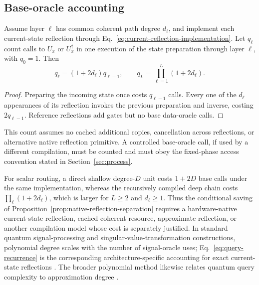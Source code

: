 \documentclass[pdflatex,sn-mathphys,NameDate,iicol]{sn-jnl}
\begin{document}
\subsection{Base-oracle accounting}

\begin{proposition}
\label{prop:query-recurrence}
Assume layer $\ell$ has common coherent path degree $d_\ell$, and implement
each current-state reflection through
Eq.~\eqref{eq:current-reflection-implementation}. Let $q_\ell$ count calls
to $U_x$ or $U_x^\dagger$ in one execution of the state preparation through
layer $\ell$, with $q_0=1$. Then
\begin{equation}
 q_\ell=(1+2d_\ell)q_{\ell-1},
 \qquad
 q_L=\prod_{\ell=1}^{L}(1+2d_\ell).
 \label{eq:query-recurrence}
\end{equation}
\end{proposition}

\begin{proof}
Preparing the incoming state once costs $q_{\ell-1}$ calls. Every one of the
$d_\ell$ appearances of its reflection invokes the previous preparation and
inverse, costing $2q_{\ell-1}$. Reference reflections add gates but no base
data-oracle calls.
\end{proof}

This count assumes no cached additional copies, cancellation across
reflections, or alternative native reflection primitive. A controlled
base-oracle call, if used by a different compilation, must be counted and
must obey the fixed-phase access convention stated in Section~\ref{sec:process}.

For scalar routing, a direct shallow degree-$D$ unit costs $1+2D$ base
calls under the same implementation, whereas the recursively compiled deep
chain costs $\prod_\ell(1+2d_\ell)$, which is larger for $L\ge2$ and
$d_\ell\ge1$. Thus the conditional saving of
Proposition~\ref{prop:native-reflection-separation} requires a hardware-native
current-state reflection, cached coherent resource, approximate reflection,
or another compilation model whose cost is separately justified. In
standard quantum signal-processing and singular-value-transformation
constructions, polynomial degree scales with the number of signal-oracle
uses; Eq.~\eqref{eq:query-recurrence} is the corresponding
architecture-specific accounting for exact current-state reflections
\citep{low2017qsp,gilyen2019qsvt}. The broader polynomial method likewise
relates quantum query complexity to approximation degree
\citep{beals2001polynomial}.
\end{document}
